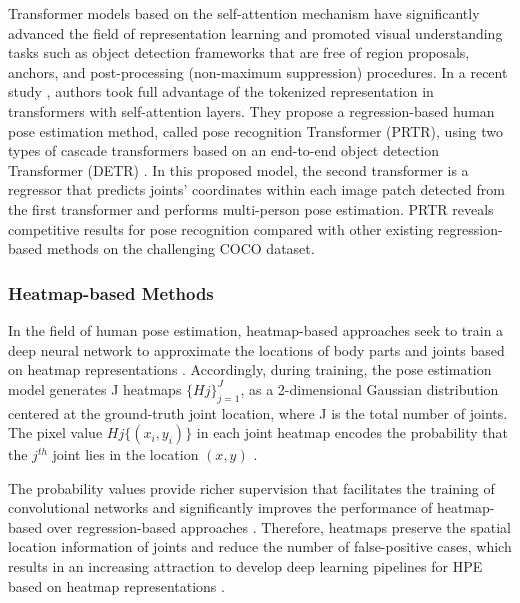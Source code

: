 Transformer models \cite{vaswani_attention_2017} based on the self-attention mechanism have significantly advanced the field of representation learning and promoted visual understanding tasks such as object detection frameworks that are free of region proposals, anchors, and post-processing (non-maximum suppression) procedures. In a recent study \cite{li_pose_2021}, authors took full advantage of the tokenized representation in transformers with self-attention layers. They propose a regression-based human pose estimation method, called pose recognition Transformer (PRTR), using two types of cascade transformers based on an end-to-end object detection Transformer (DETR) \cite{carion_end--end_2020}. In this proposed model, the second transformer is a regressor that predicts joints' coordinates within each image patch detected from the first transformer and performs multi-person pose estimation. PRTR reveals competitive results for pose recognition compared with other existing regression-based methods on the challenging COCO dataset.


\subsubsection{Heatmap-based Methods}

In the field of human pose estimation, heatmap-based approaches seek to train a deep neural network to approximate the locations of body parts and joints based on heatmap representations \cite{chen_articulated_2014, newell_stacked_2016, wei_convolutional_2016}. Accordingly, during training, the pose estimation model generates J heatmaps $\{Hj\}_{j=1}^J$, as a 2-dimensional Gaussian distribution centered at the ground-truth joint location, where J is the total number of joints. The pixel value $Hj \{(x_i,y_i)\}$ in each joint heatmap encodes the probability that the $j^{th}$ joint lies in the location $(x,y)$  \cite{tompson_joint_nodate, tompson_efficient_2015}. 

The probability values provide richer supervision that facilitates the training of convolutional networks and significantly improves the performance of heatmap-based over regression-based approaches \cite{artacho_unipose_2020, bulat_human_2016,gkioxari_chained_2016, lifshitz_human_2016,newell_stacked_2016,tompson_efficient_2015}. Therefore, heatmaps preserve the spatial location information of joints and reduce the number of false-positive cases, which results in an increasing attraction to develop deep learning pipelines for HPE based on heatmap representations \cite{carreira_human_2016,luo_lstm_2018,toshev_deeppose_2014,wei_convolutional_2016}.

